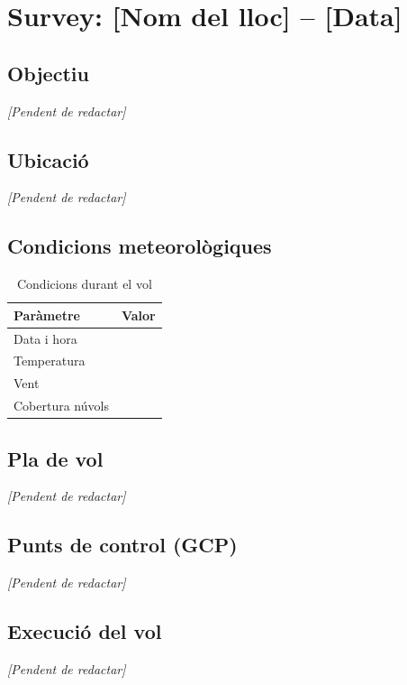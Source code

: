 \chapter{Survey: [Nom del lloc] -- [Data]}
\label{chap:survey-template}


\section{Objectiu}
\textit{[Pendent de redactar]}

\section{Ubicació}
\textit{[Pendent de redactar]}

\section{Condicions meteorològiques}
\begin{table}[H]
    \centering
    \caption{Condicions durant el vol}
    \label{tab:condicions-survey}
    \begin{tabular}{lc}
        \toprule
        Paràmetre & Valor \\
        \midrule
        Data i hora &  \\
        Temperatura &  \\
        Vent &  \\
        Cobertura núvols &  \\
        \bottomrule
    \end{tabular}
\end{table}

\section{Pla de vol}
\textit{[Pendent de redactar]}

\section{Punts de control (GCP)}
\textit{[Pendent de redactar]}

\section{Execució del vol}
\textit{[Pendent de redactar]}

